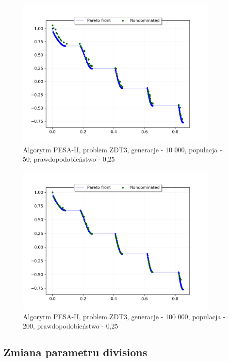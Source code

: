 \documentclass{classrep}
\begin{document}
\begin{figure}[H]
    \centering
    \includegraphics[width=0.9\textwidth]{img2/PESAII_ZDT3_g10000_p50_r0,25.png}
    \caption{Algorytm PESA-II, problem ZDT3, \newline generacje - 10 000, populacja - 50, prawdopodobieństwo - 0,25}
\end{figure}

\begin{figure}[H]
    \centering
    \includegraphics[width=0.9\textwidth]{img2/PESAII_ZDT3_g100000_p200_r0,25.png}
    \caption{Algorytm PESA-II, problem ZDT3, \newline generacje - 100 000, populacja - 200, prawdopodobieństwo - 0,25}
\end{figure}


\subsection{Zmiana parametru divisions}
\end{document}
